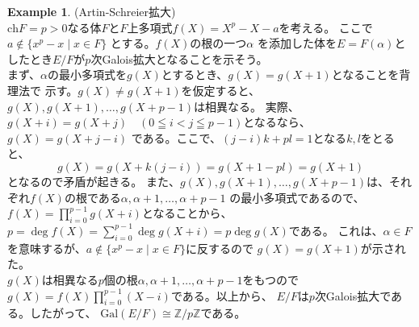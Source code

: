 \documentclass[dvipdfmx]{jsarticle}
\theoremstyle{definition}
\newtheorem{example}[definition]{Example}
\begin{document}
\begin{example}\label{xe2}(Artin-Schreier拡大)\\
 $\mathrm{ch}F=p>0$なる体$F$と$F$上多項式$f(X)=X^p -X-a$を考える。
 ここで$a\notin\{x^p-x\mid x\in F\}$ とする。$f(X)$の根の一つ$\alpha$
 を添加した体を$E=F(\alpha)$としたとき$E/F$が$p$次Galois拡大となることを示そう。\\
 まず、$\alpha$の最小多項式を$g(X)$とするとき、$g(X)=g(X+1)$となることを背理法で
 示す。$g(X)\ne g(X+1)$を仮定すると、$g(X),g(X+1),\ldots ,g(X+p-1)$は相異なる。
 実際、$g(X+i)=g(X+j)\quad (0\leqq i<j\leqq p-1)$となるなら、$g(X)=g(X+j-i)$
 である。ここで、$(j-i)k+pl=1$となる$k,l$をとると、
 \[g(X)=g(X+k(j-i))=g(X+1-pl)=g(X+1)\]
  となるので矛盾が起きる。
  また、$g(X),g(X+1),\ldots ,g(X+p-1)$は、それぞれ$f(X)$の根である$\alpha,\alpha +1,\ldots ,\alpha +p-1$
  の最小多項式であるので、$f(X)=\prod _{i=0}^{p-1}g(X+i)$となることから、
  $p=\deg f(X)=\sum _{i=0}^{p-1}\deg g(X+i)=p\deg g(X)$である。
  これは、$\alpha\in F$を意味するが、$a\notin\{x^p-x\mid x\in F\}$に反するので
  $g(X)=g(X+1)$が示された。\\
  $g(X)$は相異なる$p$個の根$\alpha ,\alpha+1,\ldots ,\alpha +p-1$をもつので
  $g(X)=f(X)\prod _{i=0}^{p-1}(X-i)$である。以上から、
  $E/F$は$p$次Galois拡大である。したがって、
  $\mathrm{Gal}(E/F)\cong \mathbb{Z}/p\mathbb{Z}$である。
\end{example}
\newpage
\end{document}
